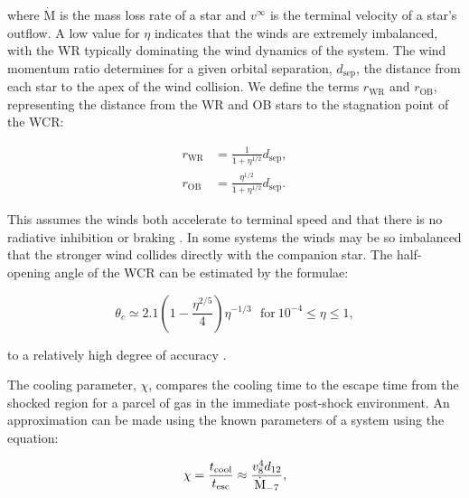 \documentclass[fleqn,usenatbib]{mnras}
\begin{document}
\noindent
where $\dot{\text{M}}$ is the mass loss rate of a star and $v^\infty$ is the terminal velocity of a star's outflow.
A low value for $\eta$ indicates that the winds are extremely imbalanced, with the WR typically dominating the wind dynamics of the system.
The wind momentum ratio determines for a given orbital separation, $d_\text{sep}$, the distance from each star to the apex of the wind collision.
We define the terms $r_\text{WR}$ and $r_\text{OB}$, representing the distance from the WR and OB stars to the stagnation point of the WCR:

\begin{subequations}
  \begin{align}
    r_\text{WR} & = \frac{1}{1+\eta^{1/2}} d_\text{sep} , \\
    r_\text{OB} & = \frac{\eta^{1/2}}{1+\eta^{1/2}} d_\text{sep} .
  \end{align}
\end{subequations}

\noindent
This assumes the winds both accelerate to terminal speed and that there is no radiative inhibition \citep{stevens_stagnation-point_1994} or braking \citep{gayley_sudden_1997}.
In some systems the winds may be so imbalanced that the stronger wind collides directly with the companion star.
The half-opening angle of the WCR can be estimated by the formulae:

\begin{equation}
  \theta_c \simeq 2.1 \left( 1 - \frac{\eta^{2/5}}{4}\right) \eta^{-1/3} ~~~ \text{for} ~ 10^{-4} \leq \eta \leq 1 ,
\end{equation}

\noindent
to a relatively high degree of accuracy \citep{eichler_particle_1993,pittardCollidingStellarWinds2018}.

The cooling parameter, $\chi$, compares the cooling time to the escape time from the shocked region for a parcel of gas in the immediate post-shock environment. An approximation can be made using the known parameters of a system using the equation:

\begin{equation}
    \label{eq:paper1-chi}
    \chi = \frac{t_\text{cool}}{t_\text{esc}} \approx \frac{v_8^4 d_{12}}{\dot{\text M}_{-7}} , 
\end{equation}
\end{document}
